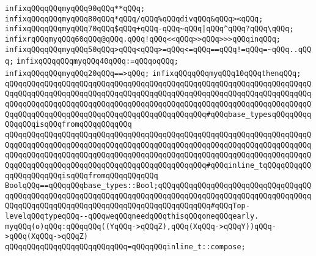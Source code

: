 \newline
\newline
\newline
\verb|infixqQQqqQQqmyqQQq90qQQq**qQQq;|\newline
\verb|infixqQQqqQQqmyqQQq80qQQq*qQQq/qQQq%qQQqdivqQQq&qQQq><qQQq;|\newline
\verb|infixqQQqqQQqmyqQQq70qQQq$qQQq+qQQq-qQQq~qQQq|\verb#|qQQq^qQQq?qQQq\qQQq;#\newline
\verb|infixrqQQqmyqQQq60qQQq@qQQq.qQQq!qQQq<<qQQq>>qQQq>>>qQQqinqQQq;|\newline
\verb|infixqQQqqQQqmyqQQq50qQQq>qQQq<qQQq>=qQQq<=qQQq==qQQq!=qQQq=~qQQq..qQQq;|\newline
\verb|infixqQQqqQQqmyqQQq40qQQq:=qQQqoqQQq;|\newline
\verb|infixqQQqqQQqmyqQQq20qQQq==>qQQq;|\newline
\verb|infixqQQqqQQqmyqQQq10qQQqthenqQQq;|\newline
\newline
\verb|qQQqqQQqqQQqqQQqqQQqqQQqqQQqqQQqqQQqqQQqqQQqqQQqqQQqqQQqqQQqqQQqqQQqqQQqqQQqqQQqqQQqqQQqqQQqqQQqqQQqqQQqqQQqqQQqqQQqqQQqqQQqqQQqqQQqqQQqqQQqqQQqqQQqqQQqqQQqqQQqqQQqqQQqqQQqqQQqqQQqqQQqqQQqqQQqqQQqqQQqqQQqqQQqqQQqqQQqqQQqqQQqqQQqqQQqqQQqqQQqqQQqqQQqqQQqqQQq#qQQqbase_typesqQQqqQQqqQQqqQQqisqQQqfromqQQqqQQqqQQq|\newline
\verb|qQQqqQQqqQQqqQQqqQQqqQQqqQQqqQQqqQQqqQQqqQQqqQQqqQQqqQQqqQQqqQQqqQQqqQQqqQQqqQQqqQQqqQQqqQQqqQQqqQQqqQQqqQQqqQQqqQQqqQQqqQQqqQQqqQQqqQQqqQQqqQQqqQQqqQQqqQQqqQQqqQQqqQQqqQQqqQQqqQQqqQQqqQQqqQQqqQQqqQQqqQQqqQQqqQQqqQQqqQQqqQQqqQQqqQQqqQQqqQQqqQQqqQQqqQQqqQQq#qQQqinline_tqQQqqQQqqQQqqQQqqQQqqQQqisqQQqfromqQQqqQQqqQQq|\newline
\newline
\verb|BoolqQQq==qQQqqQQqbase_types::Bool;qQQqqQQqqQQqqQQqqQQqqQQqqQQqqQQqqQQqqQQqqQQqqQQqqQQqqQQqqQQqqQQqqQQqqQQqqQQqqQQqqQQqqQQqqQQqqQQqqQQqqQQqqQQqqQQqqQQqqQQqqQQqqQQqqQQqqQQqqQQqqQQqqQQqqQQq#qQQqTop-levelqQQqtypeqQQq--qQQqweqQQqneedqQQqthisqQQqoneqQQqearly.|\newline
\newline
\verb|myqQQq(o)qQQq:qQQqqQQq((YqQQq->qQQqZ),qQQq(XqQQq->qQQqY))qQQq->qQQq(XqQQq->qQQqZ)|\newline
\verb|qQQqqQQqqQQqqQQqqQQqqQQqqQQq=qQQqqQQqinline_t::compose;|\newline
